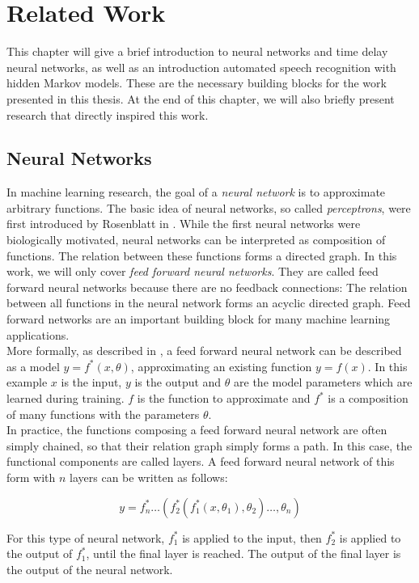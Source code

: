 
\chapter{Related Work}

This chapter will give a brief introduction to neural networks and time delay neural networks, as well as an introduction automated speech recognition with hidden Markov models. These are the necessary building blocks for the work presented in this thesis. At the end of this chapter, we will also briefly present research that directly inspired this work. 

\section{Neural Networks}

In machine learning research, the goal of a \textit{neural network} is to approximate arbitrary functions. The basic idea of neural networks, so called \textit{perceptrons}, were first introduced by Rosenblatt in \cite{rosenblatt1958perceptron}. While the first neural networks were biologically motivated, neural networks can be interpreted as composition of functions. The relation between these functions forms a directed graph. In this work, we will only cover \textit{feed forward neural networks}. They are called feed forward neural networks because there are no feedback connections: The relation between all functions in the neural network forms an acyclic directed graph. Feed forward networks are an important building block for many machine learning applications. 
\\
More formally, as described in \cite{Goodfellow-et-al-2016}, a feed forward neural network can be described as a model $y = f^*(x, \theta)$, approximating an existing function $y = f(x)$. In this example $x$ is the input, $y$ is the output and $\theta$ are the model parameters which are learned during training. $f$ is the function to approximate and $f^*$ is a composition of many functions with the parameters $\theta$. 
\\
In practice, the functions composing a feed forward neural network are often simply chained, so that their relation graph simply forms a path. In this case, the functional components are called layers. A feed forward neural network of this form with $n$ layers can be written as follows:

\[y = f^*_n \dots (f^*_2(f^*_1(x, \theta_1), \theta_2) \dots, \theta_n)\]

For this type of neural network, $f^*_1$ is applied to the input, then $f^*_2$ is applied to the output of $f^*_1$, until the final layer is reached. The output of the final layer is the output of the neural network.

